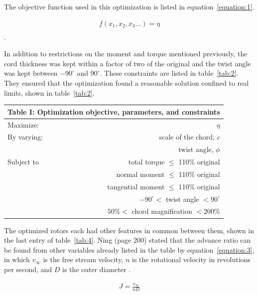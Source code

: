 \documentclass[journal ]{new-aiaa}
\begin{document}
The objective function used in this optimization is listed in equation~\eqref{equation:1}. 

\begin{equation}
	\begin{aligned}
	\label{equation:1}
	f(x_{1}, x_{2}, x_{3}...) = \eta \\
	\end{aligned}
\end{equation}.

In addition to restrictions on the moment and torque mentioned previously, the cord thickness was kept within a factor of two of the original and the twist angle was kept between $-90^{\circ}$ and $90^{\circ}$. These constraints are listed in table~\eqref{tab:2}. They ensured that the optimization found a reasonable solution confined to real limits, shown in table~\eqref{tab:2}.

\begin{center}
\begin{tabular}{l  r}
	 \multicolumn{2}{c}{Table I: Optimization objective, parameters, and constraints}  \\ \hline
  	Maximize: & $\eta$ \\ \hline
  	By varying: & scale of the chord, $c$ \\ 
  	 & twist angle, $\phi$ \\  \hline
  	Subject to & total torque $\leq$ 110\% original \\ 
	 & normal moment $\leq$ 110\% original \\ 
	 & tangential moment $\leq$ 110\% original \\ 
	 & $-90^{\circ} <$ twist angle $< 90^{\circ}$ \\
	 & $50\% <$ chord magnification $< 200\% $ \\ \hline
\end{tabular}
\label{tab:2}
\end{center}

The optimized rotors each had other features in common between them, shown in the last entry of table~\eqref{tab:4}. Ning (page 200) stated that the advance ratio can be found from other variables already listed in the table by equation~\eqref{equation:3}, in which $v_{\infty}$ is the free stream velocity, $n$ is the rotational velocity in revolutions per second, and $D$ is the outer diameter \cite{ComAer}.

\begin{equation}
	\begin{aligned}
	\label{equation:3}
	J = \frac{v_{\infty}}{n D}
	\end{aligned}
\end{equation}
\end{document}
